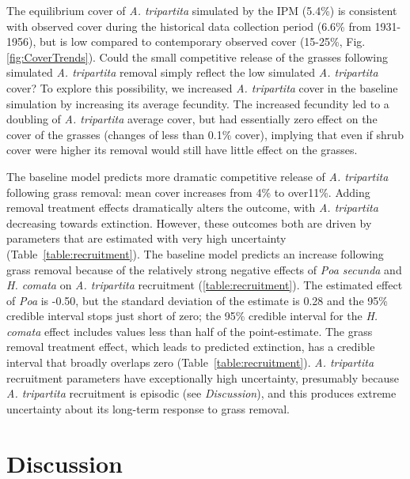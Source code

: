 \documentclass[11pt]{article}
\begin{document}
\begin{doublespacing}
 
The equilibrium cover of \textit{A. tripartita} simulated by the IPM (5.4\%) is consistent with observed cover during the historical data collection period (6.6\% from 1931-1956), but is low compared to contemporary observed cover (15-25\%, Fig. \ref{fig:CoverTrends}). Could the small competitive release of the grasses
following simulated \textit{A. tripartita} removal simply reflect the low simulated \textit{A. tripartita} cover? To explore this possibility, we increased \textit{A. tripartita} cover in the baseline simulation by increasing its average fecundity. The increased fecundity led to a doubling of \textit{A. tripartita} average cover, but had essentially zero effect on the cover of the grasses (changes of less than 0.1\% cover), implying that even if shrub cover were higher its removal would still have little effect on the grasses. 
 
The baseline model predicts more dramatic competitive release of \textit{A. tripartita} following grass removal: mean cover increases from 4\% to over11\%. 
Adding removal treatment effects dramatically alters the outcome, with \textit{A. tripartita} decreasing towards extinction. However, these outcomes both are driven by parameters that are estimated with very high uncertainty (Table~\ref{table:recruitment}). The baseline model predicts an increase following grass removal because of the relatively strong negative effects of \textit{Poa secunda} and \textit{H. comata} on \textit{A. tripartita} recruitment (\ref{table:recruitment}). The estimated effect of
\emph{Poa} is -0.50, but the standard deviation of the estimate is 0.28 and the 95\% credible interval stops just short of zero; the 95\% credible interval for the
\textit{H. comata} effect includes values less than half of the point-estimate. The grass removal treatment effect, which leads to predicted extinction, has a credible 
interval that broadly overlaps zero (Table~\ref{table:recruitment}). \textit{A. tripartita} recruitment parameters have exceptionally high uncertainty, presumably 
because \textit{A. tripartita} recruitment is episodic (see \emph{Discussion}), and this produces extreme uncertainty about its long-term 
response to grass removal.

\section*{Discussion}


\end{doublespacing}
\end{document}
